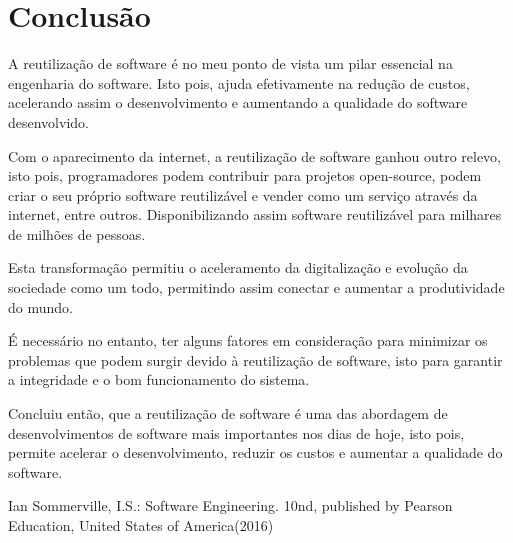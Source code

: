 \documentclass[runningheads]{llncs}
\begin{document}
\section{Conclusão}

A reutilização de software é no meu ponto de vista um pilar essencial na engenharia do software. Isto pois, ajuda efetivamente na redução de custos,  acelerando assim o desenvolvimento e aumentando a qualidade do software desenvolvido. \par
Com o aparecimento da internet, a reutilização de software ganhou outro relevo, isto pois, programadores podem contribuir para projetos open-source, podem criar o seu próprio software reutilizável e vender como um serviço através da internet, entre outros. Disponibilizando assim software reutilizável para milhares de milhões de pessoas.\par
Esta transformação permitiu o aceleramento da digitalização e evolução da sociedade como um todo, permitindo assim conectar e aumentar a produtividade do mundo.\par
É necessário no entanto, ter alguns fatores em consideração para minimizar os problemas que podem surgir devido à reutilização de software, isto para garantir a integridade e o bom funcionamento do sistema.\par
Concluiu então, que a reutilização de software é uma das abordagem de desenvolvimentos de software mais importantes nos dias de hoje, isto pois, permite acelerar o desenvolvimento, reduzir os custos e aumentar a qualidade do software.


%
%
%
% 
% 
%
\begin{thebibliography}{8}
    Ian Sommerville, I.S.: Software Engineering. 10nd, published by Pearson Education, United States of America(2016)
\end{thebibliography}
\end{document}
